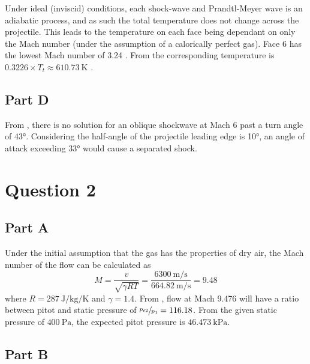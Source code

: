 \documentclass[a4paper]{article}
\begin{document}
Under ideal (inviscid) conditions, each shock-wave and Prandtl-Meyer wave is an adiabatic process, and as such the total temperature does not change across the projectile.
This leads to the temperature on each face being dependant on only the Mach number (under the assumption of a calorically perfect gas). Face 6 has the lowest Mach number of 3.24 . From \cite{NASATables} the corresponding temperature is \( 0.3226 \times T_t \approx \SI{610.73}{\kelvin}\) .

\subsection*{Part D}

From \cite{NASATables}, there is no solution for an oblique shockwave at Mach 6 past a turn angle of \ang{43}. Considering the half-angle of the projectile leading edge is \ang{10}, an angle of attack exceeding \ang{33} would cause a separated shock.

\pagebreak
\section*{Question 2}

\subsection*{Part A}

Under the initial assumption that the gas has the properties of dry air, the Mach number of the flow can be calculated as
\begin{equation}
	M = \frac{v}{\sqrt{\gamma R T}}
	= \frac{\SI{6300}{\metre\per\second}}{\SI{664.82}{\metre\per\second}}
	= 9.48
\end{equation}
where \(R = \SI{287}{\joule\per\kilogram\per\kelvin}\) and \(\gamma = 1.4\). From \cite{NASATables}, flow at Mach 9.476 will have a ratio between pitot and static pressure of \(\sfrac{p_{t2}}{p_1} = 116.18\). From the given static pressure of \(\SI{400}{\pascal}\), the expected pitot pressure is \(\SI{46.473}{\kilo\pascal}\).

\subsection*{Part B}
\end{document}
